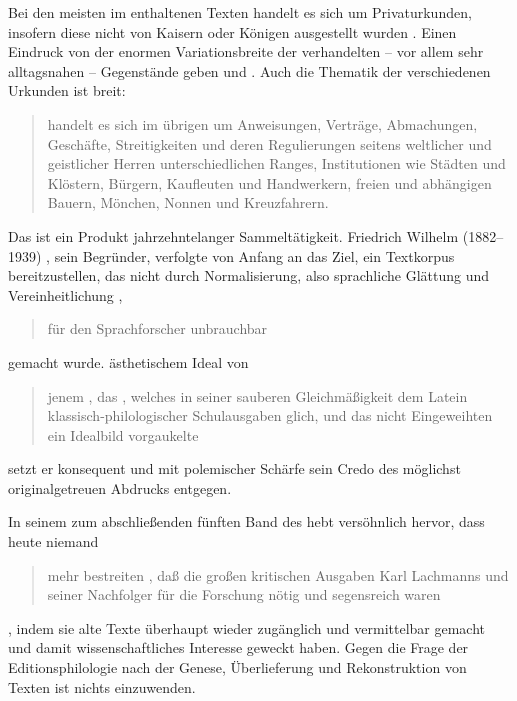 %
Bei den meisten im \CAO{} enthaltenen Texten handelt es sich um Privaturkunden,
insofern diese nicht von Kaisern oder Königen ausgestellt wurden
\autocites[vgl.][575]{frenz1998a}[585]{frenz1998b}. Einen Eindruck von der
enormen Variationsbreite der verhandelten -- vor allem sehr alltagsnahen --
Gegen\-stände geben \citet[11]{schulze2011} und \citet[35--36]{ganslmayer2012}.
Auch die Thematik der verschiedenen Urkunden ist breit:
\blockcquote[596]{schmidtwiegand1998b}{ handelt es sich im übrigen
um Anweisungen, Verträge, Abmachungen, Geschäfte, Streitigkeiten und deren
Regulierungen seitens weltlicher und geistlicher Herren unterschiedlichen
Ranges, Institutionen wie Städten und Klöstern, Bürgern, Kaufleuten und
Handwerkern, freien und abhängigen Bauern, Mönchen, Nonnen und Kreuzfahrern.}

Das \CAO{} ist ein Produkt jahrzehntelanger Sammeltätigkeit. Friedrich
Wilhelm\nocite{wilhelm1932} (1882--1939)%
, sein Begründer, verfolgte von Anfang an das Ziel, ein Textkorpus
bereitzustellen, das nicht durch Normalisierung, also sprachliche Glättung und
Vereinheitlichung \autocites[vgl.][76--84]{bein2011}{kragl2015},
\blockcquote[\RN{60}]{wilhelm1932}{für den Sprachforscher unbrauchbar} gemacht
wurde.  ästhetischem Ideal von
\blockcquote[\RN{3}]{wilhelm1932}{jenem , das
 \textelp{}, welches in seiner
sauberen Gleichmäßigkeit dem Latein klassisch-philo\-logi\-scher Schulausgaben
glich, und das \textelp{} nicht Eingeweihten ein Idealbild vorgaukelte} setzt
er konsequent und mit polemischer Schärfe sein Credo des möglichst
originalgetreuen Abdrucks entgegen.

In seinem  zum abschließenden fünften Band des
\CAO{} hebt \citeauthor{deboor1976} versöhnlich hervor, dass heute
niemand \blockcquote[\RN{13}]{deboor1976}{mehr bestreiten , daß
die großen kritischen Ausgaben Karl Lachmanns und seiner Nachfolger für die
Forschung nötig und segensreich waren}, indem sie alte Texte überhaupt wieder
zugänglich und vermittelbar gemacht und damit wissenschaftliches Interesse
geweckt haben. Gegen die Frage der Editionsphilologie nach der Genese,
Überlieferung und Rekonstruktion von Texten ist nichts einzuwenden.

